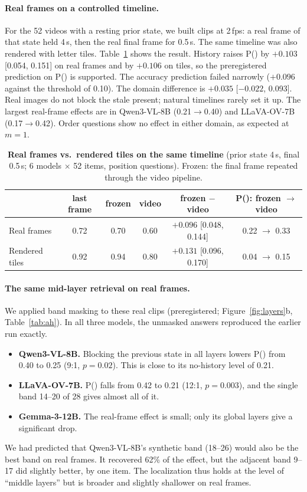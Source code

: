 \documentclass[10pt,twocolumn,letterpaper]{article}
\newcommand{\pstale}{P(\text{stale})}
\begin{document}
\paragraph{Real frames on a controlled timeline.} For the 52 videos with a resting prior state, we built clips at 2\,fps: a real frame of that state held 4\,s, then the real final frame for 0.5\,s. The same timeline was also rendered with letter tiles. Table~\ref{tab:ag} shows the result. History raises \pstale{} by $+0.103$ [0.054, 0.151] on real frames and by $+0.106$ on tiles, so the preregistered prediction on \pstale{} is supported. The accuracy prediction failed narrowly ($+0.096$ against the threshold of 0.10). The domain difference is $+0.035$ [$-0.022$, 0.093]. Real images do not block the stale present; natural timelines rarely set it up. The largest real-frame effects are in Qwen3-VL-8B (0.21$\to$0.40) and LLaVA-OV-7B (0.17$\to$0.42). Order questions show no effect in either domain, as expected at $m=1$.

\begin{table}[t]
  \centering
  \small
  \caption{\textbf{Real frames vs.\ rendered tiles on the same timeline} (prior state 4\,s, final 0.5\,s; 6 models $\times$ 52 items, position questions). Frozen: the final frame repeated through the video pipeline.}
  \label{tab:ag}
  \begin{tabular}{lccccc}
    \toprule
    & last frame & frozen & video & frozen $-$ video & \pstale: frozen $\to$ video \\
    \midrule
    Real frames & 0.72 & 0.70 & 0.60 & $+0.096$ [0.048, 0.144] & 0.22 $\to$ 0.33 \\
    Rendered tiles & 0.92 & 0.94 & 0.80 & $+0.131$ [0.096, 0.170] & 0.04 $\to$ 0.15 \\
    \bottomrule
  \end{tabular}
\end{table}

\paragraph{The same mid-layer retrieval on real frames.} We applied band masking to these real clips (preregistered; Figure~\ref{fig:layers}b, Table~\ref{tab:ah}). In all three models, the unmasked answers reproduced the earlier run exactly.
\begin{itemize}
  \item \textbf{Qwen3-VL-8B.} Blocking the previous state in all layers lowers \pstale{} from 0.40 to 0.25 (9:1, $p=0.02$). This is close to its no-history level of 0.21.
  \item \textbf{LLaVA-OV-7B.} \pstale{} falls from 0.42 to 0.21 (12:1, $p=0.003$), and the single band 14--20 of 28 gives almost all of it.
  \item \textbf{Gemma-3-12B.} The real-frame effect is small; only its global layers give a significant drop.
\end{itemize}
We had predicted that Qwen3-VL-8B's synthetic band (18--26) would also be the best band on real frames. It recovered 62\% of the effect, but the adjacent band 9--17 did slightly better, by one item. The localization thus holds at the level of ``middle layers'' but is broader and slightly shallower on real frames.
\end{document}
